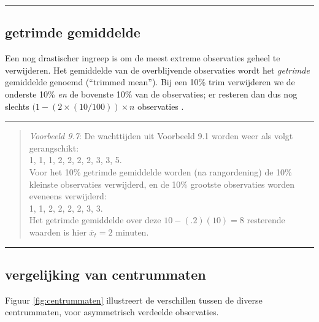 \documentclass[
]{book}
\begin{document}
\begin{center}\rule{0.5\linewidth}{0.5pt}\end{center}

\hypertarget{getrimde-gemiddelde}{%
\subsection{getrimde gemiddelde}\label{getrimde-gemiddelde}}

Een nog drastischer ingreep is om de meest extreme observaties geheel te
verwijderen. Het gemiddelde van de overblijvende observaties wordt het
\emph{getrimde} gemiddelde genoemd (``trimmed mean''). Bij een 10\% trim
verwijderen we de onderste 10\% \emph{en} de bovenste 10\% van de observaties;
er resteren dan dus nog slechts \((1- (2 \times (10/100))\times n\)
observaties \citep{Wilcox12}.

\begin{center}\rule{0.5\linewidth}{0.5pt}\end{center}

\begin{quote}
\emph{Voorbeeld 9.7}: De wachttijden uit Voorbeeld 9.1
worden weer als volgt gerangschikt:\\
1, 1, 1, 2, 2, 2, 2, 3, 3, 5.\\
Voor het 10\% getrimde gemiddelde worden (na rangordening) de 10\%
kleinste observaties verwijderd, en de 10\% grootste observaties worden
eveneens verwijderd:\\
1, 1, 2, 2, 2, 2, 3, 3.\\
Het getrimde gemiddelde over deze \(10-(.2)(10)=8\) resterende waarden is
hier \(\overline{x}_t=2\) minuten.
\end{quote}

\begin{center}\rule{0.5\linewidth}{0.5pt}\end{center}

\hypertarget{vergelijking-van-centrummaten}{%
\subsection{vergelijking van centrummaten}\label{vergelijking-van-centrummaten}}

Figuur \ref{fig:centrummaten} illustreert de verschillen tussen de
diverse centrummaten, voor asymmetrisch verdeelde observaties.
\end{document}
